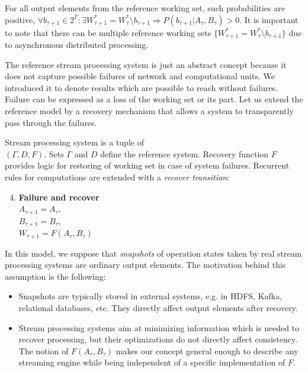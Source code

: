 For all output elements from the reference working set, such probabilities are positive, $\forall{b_{\tau+1} \in 2^{\Gamma}: \exists{W^{*}_{\tau+1}=W^{*}_{\tau}\setminus{b_{\tau+1}}}} \Rightarrow P(b_{\tau+1}|A_{\tau}, B_\tau) > 0$. It is important to note that there can be multiple reference working sets $\{W^{*}_{\tau+1}=W^{*}_{\tau}\setminus{b_{\tau+1}}\}$ due to asynchronous distributed processing. 

The reference stream processing system is just an abstract concept because it does not capture possible failures of network and computational units. We introduced it to denote results which are possible to reach without failures. Failure can be expressed as a loss of the working set or its part. Let us extend the reference model by a recovery mechanism that allows a system to transparently pass through the failures.

\begin{definition}{Stream processing system}
is a tuple of\\
$(\Gamma,D,F)$. Sets $\Gamma$ and $D$ define the reference system. Recovery function $F$ provides logic for restoring of working set in case of system failures. Recurrent rules for computations are extended with a {\em recover transition}:
\begin{enumerate}
    \setcounter{enumi}{3}
    \item \textbf{Failure and recover} \\  $A_{\tau + 1} = A_{\tau}$,\\ $B_{\tau+1}=B_{\tau}$, \\ $W_{\tau+1} = F(A_\tau,B_\tau)$
\end{enumerate}

\end{definition}

In this model, we suppose that {\em snapshots} of operation states taken by real stream processing systems are ordinary output elements. The motivation behind this assumption is the following:

\begin{itemize}
    \item Snapshots are typically stored in external systems, e.g. in HDFS, Kafka, relational databases, etc. They directly affect output elements after recovery.
    \item Stream processing systems aim at minimizing information which is needed to recover processing, but their optimizations do not directly affect consistency. The notion of $F(A_\tau,B_\tau)$ makes our concept general enough to describe any streaming engine while being independent of a specific implementation of $F$.
\end{itemize}

